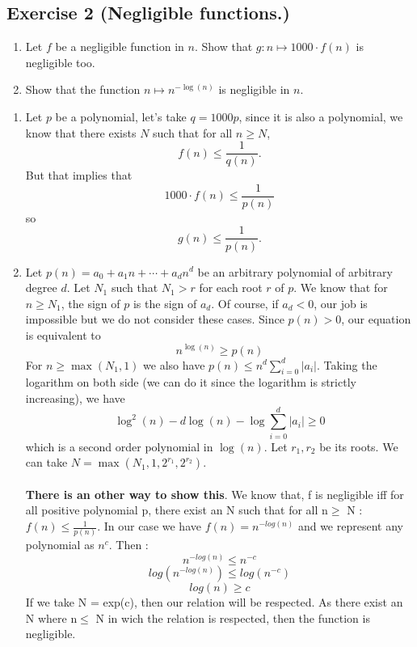 \subsection{Exercise 2 (Negligible functions.)}
\begin{enumerate}
\item Let $f$ be a negligible function in $n$. Show that $g: n \mapsto
  1000\cdot f(n)$ is negligible too.
\item Show that the function $n \mapsto n^{-\log(n)}$ is negligible in $n$.
\end{enumerate}
\begin{solution}
  \begin{enumerate}
    \item Let $p$ be a polynomial,
      let's take $q = 1000p$,
      since it is also a polynomial, we know
      that there exists $N$ such that for all $n \geq N$,
      \[ f(n) \leq \frac{1}{q(n)}. \]
      But that implies that
      \[ 1000 \cdot f(n) \leq \frac{1}{p(n)} \]
      so
      \[ g(n) \leq \frac{1}{p(n)}. \]
    \item Let $p(n) = a_0 + a_1 n + \cdots + a_dn^d$ be an
      arbitrary polynomial of arbitrary degree $d$.
      Let $N_1$ such that $N_1 > r$ for each root $r$ of $p$.
      We know that for $n \geq N_1$, the sign of $p$ is the sign of $a_d$.
      Of course, if $a_d < 0$, our job is impossible but we do not consider these cases.
      Since $p(n) > 0$, our equation is equivalent to
      \[ n^{\log(n)} \geq p(n) \]
      For $n \geq \max(N_1,1)$ we also have
      $p(n) \leq n^d \sum_{i=0}^d|a_i|$.
      Taking the logarithm on both side (we can do it since the logarithm is strictly increasing),
      we have
      \[ \log^2(n) - d \log(n) - \log\sum_{i=0}^d|a_i| \geq 0 \]
      which is a second order polynomial in $\log(n)$.
      Let $r_1,r_2$ be its roots.
      We can take $N = \max(N_1,1,2^{r_1},2^{r_2})$.
      \\ \\
      \textbf{There is an other way to show this}. We know that, f is negligible iff for all positive polynomial p, there exist an N such that for all n$\geq$ N : $ f(n) \leq \frac{1}{p(n)}$. \newline
      In our case we have $f(n) = n^{-log(n)}$ and we represent any polynomial as $n^c$. Then : 
          $$n^{-log(n)} \leq n^{-c}$$
          $$log(n^{-log(n)}) \leq log(n^{-c})$$
          $$log(n) \geq c $$
      If we take N = exp(c), then our relation will be respected. As there exist an N where n$\leq$ N in wich the relation is respected, then the function is negligible. 
  \end{enumerate}
\end{solution}


